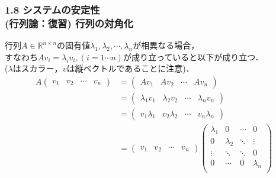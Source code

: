 \begin{frame}[t]
\frametitle{1.8 システムの安定性 \\
(行列論：復習) 行列の対角化}
行列$A \in {\mathbb R}^{n \times n}$の固有値$\lambda_1, \lambda_2,
\cdots, \lambda_n$が相異なる場合，\\
すなわち$A v_i = \lambda_i v_i, (i = 1 \cdots n)$が成り立っていると以下が成り立つ．\\
($\lambda$はスカラー，$v$は縦ベクトルであることに注意)．
\begin{align}
 A
 \left(
 \begin{array}{cccc}
  v_1 & v_2 & \cdots & v_n
 \end{array}
 \right)
 &=
 \left(
 \begin{array}{cccc}
  Av_1 & Av_2 & \cdots & Av_n
 \end{array}
 \right) \\
 &=
 \left(
 \begin{array}{cccc}
  \lambda_1 v_1 & \lambda_2 v_2 & \cdots & \lambda_n v_n
 \end{array}
 \right) \nonumber \\
 &=
 \left(
 \begin{array}{cccc}
  v_1 \lambda_1 & v_2 \lambda_2 & \cdots & v_n \lambda_n
 \end{array}
 \right) \nonumber \\
 &=
 \left(
 \begin{array}{cccc}
  v_1 & v_2 & \cdots & v_n
 \end{array}
 \right)
 \left(
 \begin{array}{cccc}
  \lambda_1 & 0         & \cdots & 0 \\
   0        & \lambda_2 & \ddots & \vdots \\
   \vdots   & \ddots    & \ddots & 0 \\
   0        & \cdots    & 0      & \lambda_n \\
 \end{array}
 \right)
\end{align}
\end{frame}


